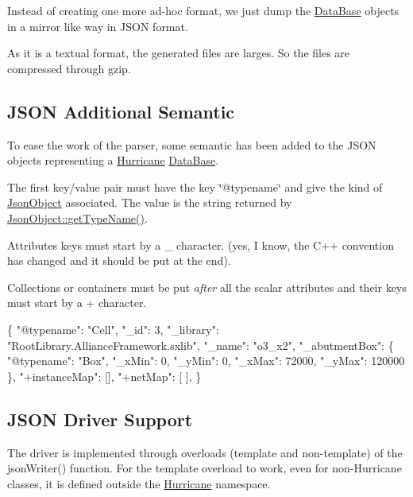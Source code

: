 Instead of creating one more ad-\/hoc format, we just dump the \hyperlink{classHurricane_1_1DataBase}{Data\+Base} objects in a mirror like way in J\+S\+ON format.

As it is a textual format, the generated files are larges. So the files are compressed through {\ttfamily gzip}.\hypertarget{group__JsonSupport_secJsonSemantic}{}\subsection{J\+S\+O\+N Additional Semantic}\label{group__JsonSupport_secJsonSemantic}
To ease the work of the parser, some semantic has been added to the J\+S\+ON objects representing a \hyperlink{namespaceHurricane}{Hurricane} \hyperlink{classHurricane_1_1DataBase}{Data\+Base}.
\begin{DoxyEnumerate}
\item The first key/value pair must have the key {\ttfamily \char`\"{}@typename\char`\"{}} and give the kind of \hyperlink{classHurricane_1_1JsonObject}{Json\+Object} associated. The value is the string returned by {\ttfamily \hyperlink{classHurricane_1_1JsonObject_a947e1c3f8dbae63bb2d086b5b827a2a5}{Json\+Object\+::get\+Type\+Name()}}.
\item Attributes keys must start by a {\ttfamily \textquotesingle{}\+\_\+\textquotesingle{}} character. (yes, I know, the C++ convention has changed and it should be put at the end).
\item Collections or containers must be put {\itshape after} all the scalar attributes and their keys must start by a {\ttfamily \textquotesingle{}+\textquotesingle{}} character.
\end{DoxyEnumerate}


\begin{DoxyCode}
\{
  "@typename": "Cell",
  "\_id": 3,
  "\_library": "RootLibrary.AllianceFramework.sxlib",
  "\_name": "o3\_x2",
  "\_abutmentBox": \{
    "@typename": "Box",
    "\_xMin": 0,
    "\_yMin": 0,
    "\_xMax": 72000,
    "\_yMax": 120000
  \},
  "+instanceMap": [],
  "+netMap": [
  ],
\}
\end{DoxyCode}
\hypertarget{group__JsonSupport_secJsonDriver}{}\subsection{J\+S\+O\+N Driver Support}\label{group__JsonSupport_secJsonDriver}
The driver is implemented through overloads (template and non-\/template) of the {\ttfamily json\+Writer()} function. For the template overload to work, even for non-\/\+Hurricane classes, it is defined outside the \hyperlink{namespaceHurricane}{Hurricane} namespace.

